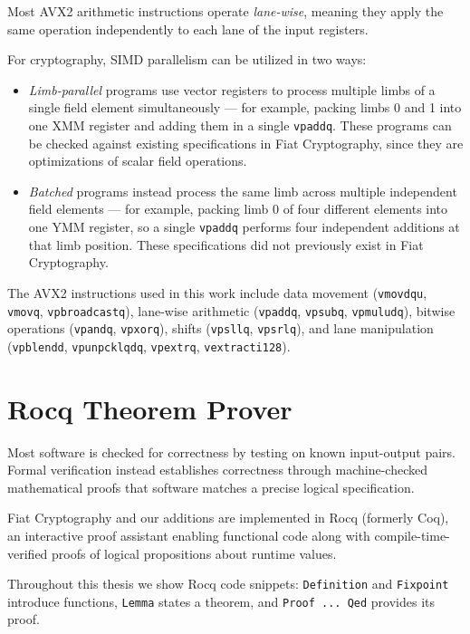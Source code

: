 Most AVX2 arithmetic instructions operate \emph{lane-wise}, meaning they apply the same operation independently to each lane of the input registers.

For cryptography, SIMD parallelism can be utilized in two ways:

\begin{itemize}
    \item \emph{Limb-parallel} programs use vector registers to process multiple limbs of a single field element simultaneously --- for example, packing limbs 0 and 1 into one XMM register and adding them in a single \texttt{vpaddq}. These programs can be checked against existing specifications in Fiat Cryptography, since they are optimizations of scalar field operations.
    \item \emph{Batched} programs instead process the same limb across multiple independent field elements --- for example, packing limb 0 of four different elements into one YMM register, so a single \texttt{vpaddq} performs four independent additions at that limb position. These specifications did not previously exist in Fiat Cryptography.
\end{itemize}

The AVX2 instructions used in this work include data movement (\texttt{vmovdqu}, \texttt{vmovq}, \texttt{vpbroadcastq}), lane-wise arithmetic (\texttt{vpaddq}, \texttt{vpsubq}, \texttt{vpmuludq}), bitwise operations (\texttt{vpandq}, \texttt{vpxorq}), shifts (\texttt{vpsllq}, \texttt{vpsrlq}), and lane manipulation (\texttt{vpblendd}, \texttt{vpunpcklqdq}, \texttt{vpextrq}, \texttt{vextracti128}).

\section{Rocq Theorem Prover}

Most software is checked for correctness by testing on known input-output pairs. Formal verification instead establishes correctness through machine-checked mathematical proofs that software matches a precise logical specification. 

Fiat Cryptography and our additions are implemented in Rocq (formerly Coq), an interactive proof assistant enabling functional code along with compile-time-verified proofs of logical propositions about runtime values.

Throughout this thesis we show Rocq code snippets: \texttt{Definition} and \texttt{Fixpoint} introduce functions, \texttt{Lemma} states a theorem, and \texttt{Proof ... Qed} provides its proof.

